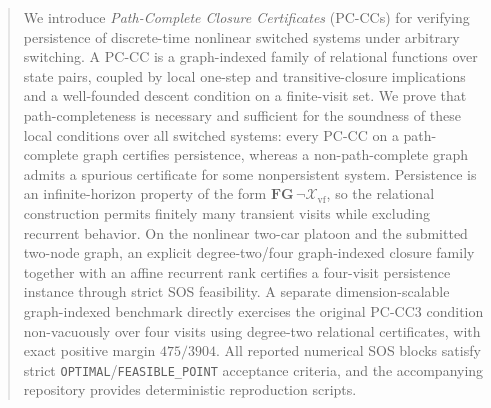 \begin{abstract}
We introduce \emph{Path-Complete Closure Certificates} (PC-CCs) for verifying persistence of discrete-time nonlinear switched systems under arbitrary switching. A PC-CC is a graph-indexed family of relational functions over state pairs, coupled by local one-step and transitive-closure implications and a well-founded descent condition on a finite-visit set. We prove that path-completeness is necessary and sufficient for the soundness of these local conditions over all switched systems: every PC-CC on a path-complete graph certifies persistence, whereas a non-path-complete graph admits a spurious certificate for some nonpersistent system. Persistence is an infinite-horizon property of the form $\mathbf F\mathbf G\,\neg\mathcal X_{\mathrm{vf}}$, so the relational construction permits finitely many transient visits while excluding recurrent behavior. On the nonlinear two-car platoon and the submitted two-node graph, an explicit degree-two/four graph-indexed closure family together with an affine recurrent rank certifies a four-visit persistence instance through strict SOS feasibility. A separate dimension-scalable graph-indexed benchmark directly exercises the original PC-CC3 condition non-vacuously over four visits using degree-two relational certificates, with exact positive margin $475/3904$. All reported numerical SOS blocks satisfy strict \texttt{OPTIMAL}/\texttt{FEASIBLE\_POINT} acceptance criteria, and the accompanying repository provides deterministic reproduction scripts.
\end{abstract}
